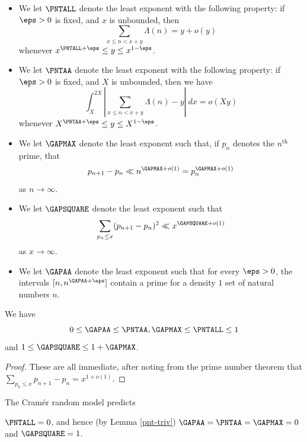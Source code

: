 \begin{definition}\label{pnt-ap}
    \begin{itemize}
        \item[(i)] We let $\PNTALL$ denote the least exponent with the following property: if $\eps > 0$ is fixed, and $x$ is unbounded, then
        $$ \sum_{x \leq n < x+y} \Lambda(n) = y + o(y)$$
        whenever $x^{\PNTALL + \eps} \leq y \leq x^{1-\eps}$.
        \item[(ii)] We let $\PNTAA$ denote the least exponent with the following property: if $\eps > 0$ is fixed, and $X$ is unbounded, then we have
        $$ \int_X^{2X} |\sum_{x \leq n < x+y} \Lambda(n)-y|\ dx = o(Xy)$$
        whenever $X^{\PNTAA + \eps} \leq y \leq X^{1-\eps}$.
        \item[(iii)] We let $\GAPMAX$ denote the least exponent such that, if $p_n$ denotes the $n^{\mathrm{th}}$ prime, that
        $$ p_{n+1} - p_n \ll n^{\GAPMAX+o(1)} = p_n^{\GAPMAX+o(1)}$$
        as $n \to \infty$.
        \item[(iv)] We let $\GAPSQUARE$ denote the least exponent such that
        $$ \sum_{p_n \leq x} (p_{n+1}-p_n)^2 \ll x^{\GAPSQUARE+o(1)}$$
        as $x \to \infty$.
        \item[(v)] We let $\GAPAA$ denote the least exponent such that for every $\eps>0$, the intervals $[n, n^{\GAPAA+\eps}]$ contain a prime for a density $1$ set of natural numbers $n$.
    \end{itemize}
\end{definition}

\begin{lemma}\label{pnt-triv}
    We have
    $$ 0 \leq \GAPAA \leq \PNTAA, \GAPMAX \leq \PNTALL \leq 1$$
    and $1 \leq \GAPSQUARE \leq 1+\GAPMAX$.
\end{lemma}

\begin{proof} These are all immediate, after noting from the prime number theorem that $\sum_{p_n \leq x} p_{n+1} - p_n = x^{1+o(1)}$.
\end{proof}

The Cram\'er random model \cite{cramer} predicts

\begin{conjecture} $\PNTALL = 0$, and hence (by Lemma \ref{pnt-triv}) $\GAPAA = \PNTAA = \GAPMAX=0$ and $\GAPSQUARE=1$.
\end{conjecture}

